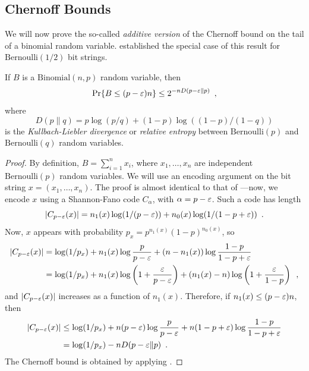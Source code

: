 \documentclass{patmorin}
\begin{document}
\subsection{Chernoff Bounds}

We will now prove the so-called \emph{additive version} of the
Chernoff bound on the tail of a binomial random
variable.  established the special case of this
result for $\mathrm{Bernoulli}(1/2)$ bit strings.

\begin{thm}
  If $B$ is a $\mathrm{Binomial}(n,p)$ random variable, then
  \[
  \Pr\{B\le(p-\varepsilon)n\} \le 2^{-nD(p-\varepsilon \| p)} \enspace ,
  \]
  where 
  \[ 
  D(p \| q)= p\log (p/q) + (1-p)\log ((1 - p)/(1 - q))
  \]
  is the \emph{Kullbach-Liebler divergence} or \emph{relative entropy}
  between $\mathrm{Bernoulli}(p)$ and $\mathrm{Bernoulli}(q)$ random
  variables.
\end{thm}

\begin{proof}
  By definition, $B=\sum_{i=1}^n x_i$, where $x_1,\ldots,x_n$ are
  independent $\mathrm{Bernoulli}(p)$ random variables.  We will use
  an encoding argument on the bit string $x=(x_1,\ldots,x_n)$. The
  proof is almost identical to that of ---now,
  we encode $x$ using a Shannon-Fano code $C_\alpha$, with $\alpha = p
  - \varepsilon$. Such a code has length
  \[
  |C_{p - \varepsilon}(x)| = n_1(x) \log (1/(p - \varepsilon)) + n_0(x) \log (1/(1 - p + \varepsilon)) \enspace .
  \]
  Now, $x$ appears with probability $p_x = p^{n_1(x)} (1 - p)^{n_0(x)}$, so
  \begin{align*}
    |C_{p - \varepsilon}(x)| &= \log(1/p_x) + n_1(x) \log \frac{p}{p - \varepsilon} + (n - n_1(x)) \log \frac{1 - p}{1 - p + \varepsilon} \\
    &= \log (1/p_x) + n_1(x) \log \left(1 + \frac{\varepsilon}{p - \varepsilon}\right) + (n_1(x) - n) \log \left(1 + \frac{\varepsilon}{1 - p}\right) \enspace ,
  \end{align*}
  and $|C_{p - \varepsilon}(x)|$ increases as a function of $n_1(x)$. Therefore, if
  $n_1(x) \le (p - \varepsilon)n$, then
  \begin{align*}
    |C_{p - \varepsilon}(x)| &\le \log (1/p_x) + n (p - \varepsilon) \log \frac{p}{p - \varepsilon} + n (1 - p + \varepsilon) \log \frac{1 - p}{1 - p + \varepsilon} \\
            &= \log (1/p_x) - n D(p - \varepsilon \| p) \enspace .
  \end{align*}
  The Chernoff bound is obtained by applying .
\end{proof}
\end{document}
